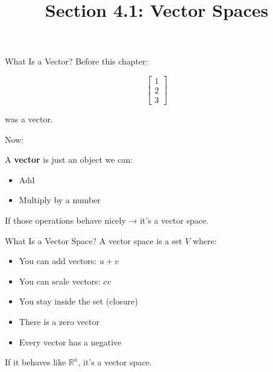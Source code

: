 \documentclass{beamer}
\title{Section 4.1: Vector Spaces}
\author{}
\date{}
\begin{document}
\begin{frame}
\titlepage
\end{frame}

\begin{frame}{What Is a Vector?}
Before this chapter:

\[
\begin{bmatrix}1 \\ 2 \\ 3\end{bmatrix}
\]

was a vector.

Now:

A \textbf{vector} is just an object we can:
\begin{itemize}
    \item Add
    \item Multiply by a number
\end{itemize}

If those operations behave nicely → it's a vector space.
\end{frame}


\begin{frame}{What Is a Vector Space?}
A vector space is a set $V$ where:

\begin{itemize}
    \item You can add vectors: $u + v$
    \item You can scale vectors: $c v$
    \item You stay inside the set (closure)
    \item There is a zero vector
    \item Every vector has a negative
\end{itemize}

If it behaves like $\mathbb{R}^n$, it's a vector space.
\end{frame}

\end{document}
